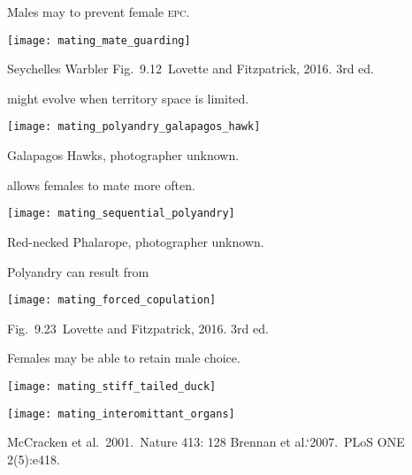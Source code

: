 \documentclass[t]{beamer}
\newcommand{\cornell}[1]{Fig.~#1~Lovette and Fitzpatrick, 2016. 3rd ed.}
\newcommand{\backskip}{\vspace{-0.5\baselineskip}}
\begin{document}

\begin{frame}[t]{Males may  to prevent female \textsc{epc.}}

\backskip
\centering
\texttt{[image: mating\_mate\_guarding]}

\vfilll

\tiny Seychelles Warbler \hfill \cornell{9.12}
\end{frame}


\begin{frame}[t]{ might evolve when territory space is limited.}
\backskip

\texttt{[image: mating\_polyandry\_galapagos\_hawk]}

\vfilll

\tinyfill Galapagos Hawks, photographer unknown.
\end{frame}


\begin{frame}[t]{ allows females to mate more often.}

\backskip

\texttt{[image: mating\_sequential\_polyandry]}

\vfilll

\tinyfill Red-necked Phalarope, photographer unknown.
\end{frame}


\begin{frame}[t]{Polyandry can result from }

\backskip

\texttt{[image: mating\_forced\_copulation]}

\vfilll

\tinyfill \cornell{9.23}
\end{frame}


\begin{frame}[t]{Females may be able to retain male choice.}

\backskip

\begin{multicols}{2}
\centering

\noindent\texttt{[image: mating\_stiff\_tailed\_duck]}

\columnbreak

\noindent \texttt{[image: mating\_interomittant\_organs]}

\vfilll

\tinyfill McCracken et al.~2001.~Nature 413: 128\newline 
\tinyfill Brennan et al.`2007.~PLoS ONE 2(5):e418. 

\end{multicols}

\end{frame}
\end{document}
